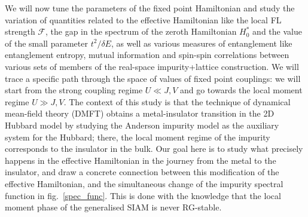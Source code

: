 \documentclass[10pt]{report}
\numberwithin{equation}{section}
\begin{document}
We will now tune the parameters of the fixed point Hamiltonian and study the variation of quantities related to the effective Hamiltonian like the local FL strength \(\mathcal{F}\), the gap in the spectrum of the zeroth Hamiltonian \(H_0^*\) and the value of the small parameter \(t^2/\delta E\), as well as various measures of entanglement like entanglement entropy, mutual information and spin-spin correlations between various sets of members of the real-space impurity+lattice construction. We will trace a specific path through the space of values of fixed point couplings: we will start from the strong coupling regime \(U \ll J,V\) and go towards the local moment regime \(U \gg J,V\). The context of this study is that the technique of dynamical mean-field theory (DMFT) obtains a metal-insulator transition in the 2D Hubbard model by studying the Anderson impurity model as the auxiliary system for the Hubbard; there, the local moment regime of the impurity corresponds to the insulator in the bulk. Our goal here is to study what precisely happens in the effective Hamiltonian in the journey from the metal to the insulator, and draw a concrete connection between this modification of the effective Hamiltonian, and the simultaneous change of the impurity spectral function in fig.~\ref{spec_func}. This is done with the knowledge that the local moment phase of the generalised SIAM is never RG-stable.
\end{document}
